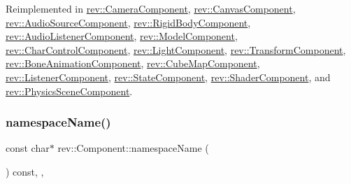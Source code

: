 Reimplemented in \mbox{\hyperlink{classrev_1_1_camera_component_a07103046e8db3a1a5c6a6684016df0ea}{rev\+::\+Camera\+Component}}, \mbox{\hyperlink{classrev_1_1_canvas_component_a8d5d6c277edd55e7fd0bbfb29045d44a}{rev\+::\+Canvas\+Component}}, \mbox{\hyperlink{classrev_1_1_audio_source_component_ab2de22f97f0aa65fe43d125c3be91117}{rev\+::\+Audio\+Source\+Component}}, \mbox{\hyperlink{classrev_1_1_rigid_body_component_a993d378bf041f1cec6c941b1f64b3e48}{rev\+::\+Rigid\+Body\+Component}}, \mbox{\hyperlink{classrev_1_1_audio_listener_component_afb4f9251d5de8ff5e320aec4aa68bc57}{rev\+::\+Audio\+Listener\+Component}}, \mbox{\hyperlink{classrev_1_1_model_component_a9c1b2295e5a05104cd249ee53ccfa700}{rev\+::\+Model\+Component}}, \mbox{\hyperlink{classrev_1_1_char_control_component_a0bbb105cdc5c80ed066045822a70dc3b}{rev\+::\+Char\+Control\+Component}}, \mbox{\hyperlink{classrev_1_1_light_component_af11f9de700582bcf3f5f80ef66adf89b}{rev\+::\+Light\+Component}}, \mbox{\hyperlink{classrev_1_1_transform_component_aed45da6b047fa6615c1064ac8f23c8fb}{rev\+::\+Transform\+Component}}, \mbox{\hyperlink{classrev_1_1_bone_animation_component_a089e4d7c8df32961bfc9413d7d9524a2}{rev\+::\+Bone\+Animation\+Component}}, \mbox{\hyperlink{classrev_1_1_cube_map_component_a6270b3cb1d7252ff9f7542d5479edb5b}{rev\+::\+Cube\+Map\+Component}}, \mbox{\hyperlink{classrev_1_1_listener_component_a67eced059b106a622377d0223267144c}{rev\+::\+Listener\+Component}}, \mbox{\hyperlink{classrev_1_1_state_component_a801025ae9c32d3b5eaa4d50c773e14c2}{rev\+::\+State\+Component}}, \mbox{\hyperlink{classrev_1_1_shader_component_a1ec4c34b1c25eec0ec43d1653fa106a0}{rev\+::\+Shader\+Component}}, and \mbox{\hyperlink{classrev_1_1_physics_scene_component_a3cafe0564c1ef3c2eb712ee6af6a2b1e}{rev\+::\+Physics\+Scene\+Component}}.

\mbox{\label{classrev_1_1_component_ae2827b14c278588b95e01c4743fae674}} 
\subsubsection{\texorpdfstring{namespaceName()}{namespaceName()}}
{\footnotesize\ttfamily const char$\ast$ rev\+::\+Component\+::namespace\+Name (\begin{DoxyParamCaption}{ }\end{DoxyParamCaption}) const\hspace{0.3cm}{\ttfamily [inline]}, {\ttfamily [override]}, {\ttfamily [virtual]}}



